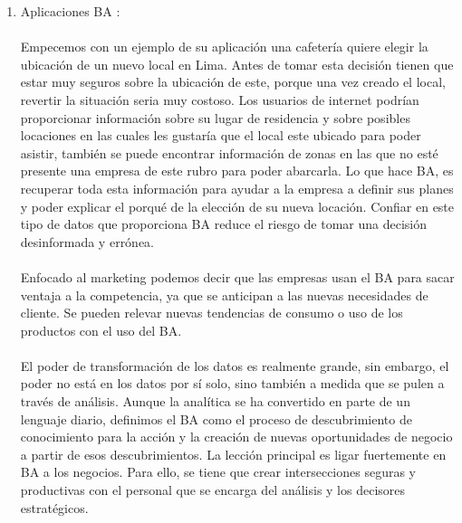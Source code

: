 \begin{enumerate}[2.]

	\item Aplicaciones BA :
\\
\\
Empecemos con un ejemplo de su aplicaci\'on una cafeter\'ia quiere elegir la ubicaci\'on de un nuevo local en Lima. Antes de tomar esta decisi\'on tienen que estar muy seguros sobre la ubicaci\'on de este, porque una vez creado el local, revertir la situaci\'on seria muy costoso. Los usuarios de internet podr\'ian proporcionar informaci\'on sobre su lugar de residencia y sobre posibles locaciones en las cuales les gustar\'ia que el local este ubicado para poder asistir, tambi\'en se puede encontrar informaci\'on de zonas en las que no est\'e presente una empresa de este rubro para poder abarcarla. Lo que hace BA, es recuperar toda esta informaci\'on para ayudar a la empresa a definir sus planes y poder explicar el porqué de la elecci\'on de su nueva locaci\'on. Confiar en este tipo de datos que proporciona BA reduce el riesgo de tomar una decisi\'on desinformada y err\'onea.
\\
\\
Enfocado al marketing podemos decir que las empresas usan el BA para sacar ventaja a la competencia, ya que se anticipan a las nuevas necesidades de cliente. Se pueden relevar nuevas tendencias de consumo o uso de los productos con el uso del BA.
\\
\\
El poder de transformaci\'on de los datos es realmente grande, sin embargo, el poder no est\'a en los datos por s\'i solo, sino tambi\'en a medida que se pulen a trav\'es de an\'alisis. Aunque la anal\'itica se ha convertido en parte de un lenguaje diario, definimos el BA como el proceso de descubrimiento de conocimiento para la acci\'on y la creaci\'on de nuevas oportunidades de negocio a partir de esos descubrimientos. La lecci\'on principal es ligar fuertemente en BA a los negocios. Para ello, se tiene que crear intersecciones seguras y productivas con el personal que se encarga del análisis y los decisores estrat\'egicos.


\end{enumerate}

